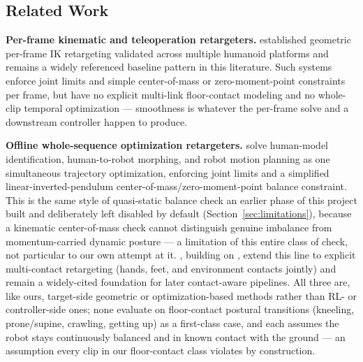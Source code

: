 \subsection{Related Work}
\label{sec:related-work}

\noindent\textbf{Per-frame kinematic and teleoperation retargeters.}
\cite{darvish2019geometric} established geometric per-frame IK retargeting
validated across multiple humanoid platforms and remains a widely
referenced baseline pattern in this literature. Such systems enforce joint
limits and simple center-of-mass or zero-moment-point constraints per frame,
but have no explicit multi-link floor-contact modeling and no whole-clip
temporal optimization --- smoothness is whatever the per-frame solve and a
downstream controller happen to produce.

\noindent\textbf{Offline whole-sequence optimization retargeters.}
\cite{ayusawa2017morphing} solve human-model identification,
human-to-robot morphing, and robot motion planning as one simultaneous
trajectory optimization, enforcing joint limits and a simplified
linear-inverted-pendulum center-of-mass/zero-moment-point balance
constraint. This is the same style of quasi-static balance check an earlier
phase of this project built and deliberately left disabled by default
(Section~\ref{sec:limitations}), because a kinematic center-of-mass check
cannot distinguish genuine imbalance from momentum-carried dynamic posture
--- a limitation of this entire class of check, not particular to our own
attempt at it. \cite{otani2017adaptive}, building on
\cite{difava2016multicontact}, extend this line to explicit multi-contact
retargeting (hands, feet, and environment contacts jointly) and remain a
widely-cited foundation for later contact-aware pipelines. All three are,
like ours, target-side geometric or optimization-based methods rather than
RL- or controller-side ones; none evaluate on floor-contact postural
transitions (kneeling, prone/supine, crawling, getting up) as a first-class
case, and each assumes the robot stays continuously balanced and in known
contact with the ground --- an assumption every clip in our floor-contact
class violates by construction.

